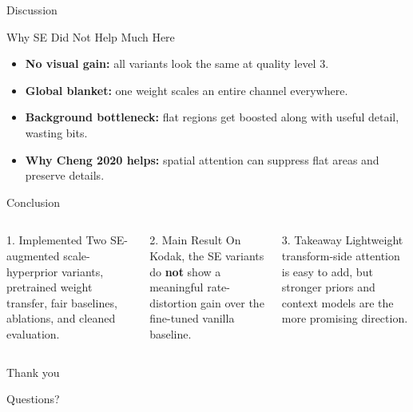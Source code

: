 \documentclass[aspectratio=169,10pt]{beamer}
\begin{document}
\begin{frame}{Discussion}
  \begin{alertblock}{Why SE Did Not Help Much Here}
    \small
    \begin{itemize}
      \item \textbf{No visual gain:} all variants look the same at quality level 3.
      \item \textbf{Global blanket:} one weight scales an entire channel everywhere.
      \item \textbf{Background bottleneck:} flat regions get boosted along with useful detail, wasting bits.
      \item \textbf{Why Cheng 2020 helps:} spatial attention can suppress flat areas and preserve details.
    \end{itemize}
  \end{alertblock}
\end{frame}

\begin{frame}{Conclusion}
  \begin{columns}[T,onlytextwidth]
    \begin{block}{1. Implemented}
      Two SE-augmented scale-hyperprior variants, pretrained weight transfer, fair baselines, ablations, and cleaned evaluation.
    \end{block}

    \begin{alertblock}{2. Main Result}
      On Kodak, the SE variants do \textbf{not} show a meaningful rate-distortion gain over the fine-tuned vanilla baseline.
    \end{alertblock}

    \begin{block}{3. Takeaway}
      Lightweight transform-side attention is easy to add, but stronger priors and context models are the more promising direction.
    \end{block}
  \end{columns}
\end{frame}

\begin{frame}[plain]
  \begin{center}
    \vspace{1.8cm}
    {\color{Ink}Thank you\par}
    \vspace{0.45cm}
    {\Large\color{Stone}Questions?\par}
  \end{center}
\end{frame}
\end{document}
